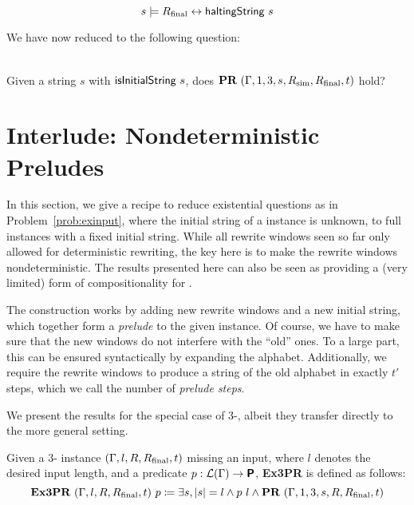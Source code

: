 \begin{proposition}
  \[ s \models R_{\text{final}} \leftrightarrow \textsf{haltingString}~s \]
\end{proposition}

We have now reduced \gennp{} to the following question: 
\begin{problem}\label{prob:exinput}~\\
  Given a string $s$ with $\textsf{isInitialString}~s$, does $\textbf{PR}{}~(\Gamma, 1, 3, s, R_{\text{sim}}, R_{\text{final}}, t)$ hold?
\end{problem}

\section{Interlude: Nondeterministic Preludes}\label{sec:preludes}
In this section, we give a recipe to reduce existential questions as in Problem~\ref{prob:exinput}, where the initial string of a \PR{} instance is unknown, to full \PR{} instances with a fixed initial string. 
While all rewrite windows seen so far only allowed for deterministic rewriting, the key here is to make the rewrite windows nondeterministic. The results presented here can also be seen as providing a (very limited) form of compositionality for \PR{}.

The construction works by adding new rewrite windows and a new initial string, which together form a \emph{prelude} to the given \PR{} instance. 
Of course, we have to make sure that the new windows do not interfere with the ``old'' ones. To a large part, this can be ensured syntactically by expanding the alphabet. Additionally, we require the rewrite windows to produce a string of the old alphabet in exactly $t'$ steps, which we call the number of \emph{prelude steps}. 

We present the results for the special case of 3-\PR{}, albeit they transfer directly to the more general setting.

\newcommand{\expr}{\textbf{Ex3PR}}
\begin{definition}[Existential 3-\PR{} (\expr{})]
  \mnote{\expr{}}
  Given a 3-\PR{} instance $(\Gamma, l, R, R_{\text{final}}, t)$ missing an input, where $l$ denotes the desired input length, and a predicate $p : \mathcal{L} (\Gamma) \rightarrow \textsf{\bfseries P}$, \expr{} is defined as follows:
  \[\expr{}~(\Gamma, l, R, \Rfinal, t)~p \defeq \exists s, \length{s} = l \land p~l \land \PR{}~(\Gamma, 1, 3, s, R, \Rfinal, t) \]
\end{definition}

